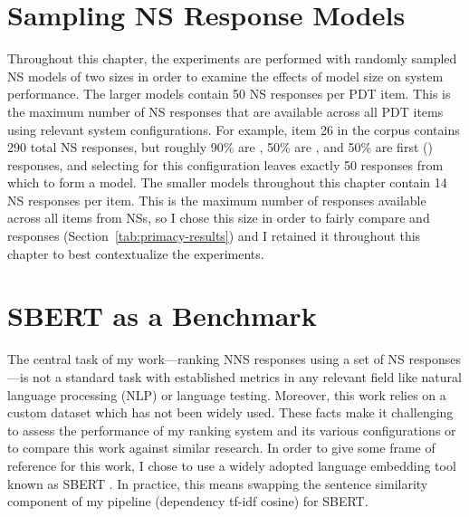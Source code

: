 

\section{Sampling NS Response Models}
\label{sec:sampling}

Throughout this chapter, the experiments are performed with randomly sampled NS models of two sizes in order to examine the effects of model size on system performance. The larger models contain 50 NS responses per PDT item. This is the maximum number of NS responses that are available across all PDT items using relevant system configurations. For example, item 26 in the corpus contains 290 total NS responses, but roughly 90\% are , 50\% are , and 50\% are first () responses, and selecting for this configuration leaves exactly 50 responses from which to form a model. The smaller models throughout this chapter contain 14 NS responses per item. This is the maximum number of responses available across all items from  NSs, so I chose this size in order to fairly compare  and  responses (Section~\ref{tab:primacy-results}) and I retained it throughout this chapter to best contextualize the  experiments.

\section{SBERT as a Benchmark}
\label{sec:bert-benchmark}
The central task of my work---ranking NNS responses using a set of NS responses---is not a standard task with established metrics in any relevant field like natural language processing (NLP) or language testing. Moreover, this work relies on a custom dataset which has not been widely used. These facts make it challenging to assess the performance of my ranking system and its various configurations or to compare this work against similar research. In order to give some frame of reference for this work, I chose to use a widely adopted language embedding tool known as SBERT \cite{sbert2020}. In practice, this means swapping the sentence similarity component of my pipeline (dependency tf-idf cosine) for SBERT.

